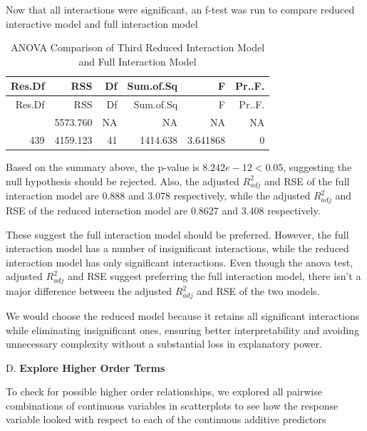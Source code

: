 \documentclass[
]{article}
\begin{document}
Now that all interactions were significant, an f-test was run to compare
reduced interactive model and full interaction model

\begin{longtable}[]{@{}rrrrrr@{}}
\caption{ANOVA Comparison of Third Reduced Interaction Model and Full
Interaction Model}\tabularnewline
\toprule\noalign{}
Res.Df & RSS & Df & Sum.of.Sq & F & Pr..F. \\
\midrule\noalign{}
\endfirsthead
\toprule\noalign{}
Res.Df & RSS & Df & Sum.of.Sq & F & Pr..F. \\
\midrule\noalign{}
\endhead
\bottomrule\noalign{}
\endlastfoot
480 & 5573.760 & NA & NA & NA & NA \\
439 & 4159.123 & 41 & 1414.638 & 3.641868 & 0 \\
\end{longtable}

Based on the summary above, the p-value is \(8.242e-12<0.05\),
suggesting the null hypothesis should be rejected. Also, the adjusted
\(R^2_{adj}\) and RSE of the full interaction model are 0.888 and 3.078
respectively, while the adjusted \(R^2_{adj}\) and RSE of the reduced
interaction model are 0.8627 and 3.408 respectively.

These suggest the full interaction model should be preferred. However,
the full interaction model has a number of insignificant interactions,
while the reduced interaction model has only significant interactions.
Even though the anova test, adjusted \(R^2_{adj}\) and RSE suggest
preferring the full interaction model, there isn't a major difference
between the adjusted \(R^2_{adj}\) and RSE of the two models.

We would choose the reduced model because it retains all significant
interactions while eliminating insignificant ones, ensuring better
interpretability and avoiding unnecessary complexity without a
substantial loss in explanatory power.

D. \textbf{Explore Higher Order Terms}

To check for possible higher order relationships, we explored all
pairwise combinations of continuous variables in scatterplots to see how
the response variable looked with respect to each of the continuous
additive predictors
\end{document}
